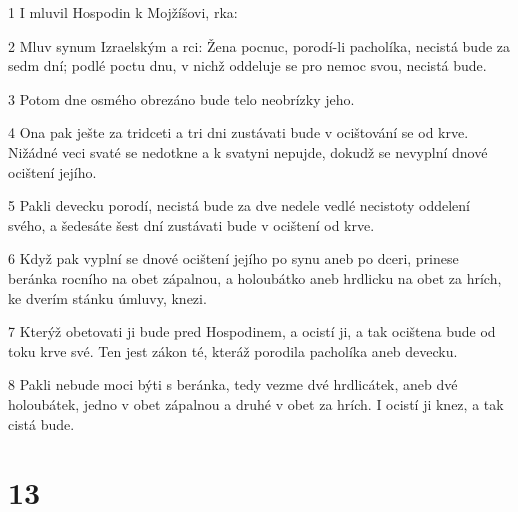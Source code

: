 \par 1 I mluvil Hospodin k Mojžíšovi, rka:
\par 2 Mluv synum Izraelským a rci: Žena pocnuc, porodí-li pacholíka, necistá bude za sedm dní; podlé poctu dnu, v nichž oddeluje se pro nemoc svou, necistá bude.
\par 3 Potom dne osmého obrezáno bude telo neobrízky jeho.
\par 4 Ona pak ješte za tridceti a tri dni zustávati bude v ocištování se od krve. Nižádné veci svaté se nedotkne a k svatyni nepujde, dokudž se nevyplní dnové ocištení jejího.
\par 5 Pakli devecku porodí, necistá bude za dve nedele vedlé necistoty oddelení svého, a šedesáte šest dní zustávati bude v ocištení od krve.
\par 6 Když pak vyplní se dnové ocištení jejího po synu aneb po dceri, prinese beránka rocního na obet zápalnou, a holoubátko aneb hrdlicku na obet za hrích, ke dverím stánku úmluvy, knezi.
\par 7 Kterýž obetovati ji bude pred Hospodinem, a ocistí ji, a tak ocištena bude od toku krve své. Ten jest zákon té, kteráž porodila pacholíka aneb devecku.
\par 8 Pakli nebude moci býti s beránka, tedy vezme dvé hrdlicátek, aneb dvé holoubátek, jedno v obet zápalnou a druhé v obet za hrích. I ocistí ji knez, a tak cistá bude.

\chapter{13}

